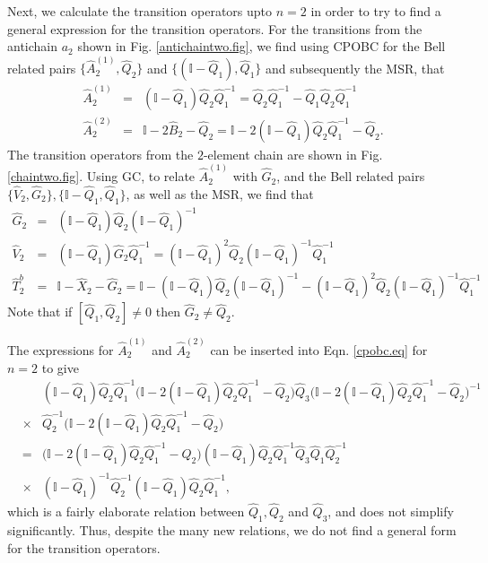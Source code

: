 \documentclass[11pt]{article}
\newcommand{\hA}{\hat { A}}
\newcommand{\hG}{\hat G}
\newcommand{\hQ}{\hat Q}
\newcommand{\achain}{a}
\newcommand{\id}{\mathbb I}
\newcommand{\h}{\hat}
\begin{document}
Next, we calculate the transition operators  upto
$n=2$ in order to try to find a general expression for the 
transition operators. 
For the transitions from the antichain $\achain_2$ shown in
Fig. \ref{antichaintwo.fig}, we find  using CPOBC for the   Bell related pairs $\{\hA_2^{(1)},
\hQ_2 \}$ and $\{ (\id -\hQ_1), \hQ_1\}$ and subsequently the MSR,
that 
\begin{eqnarray}
\h A_2^{(1)}&=&(\mathbb{I}-\h Q_1) \h Q_2\h Q_1^{-1}=\h Q_2\h Q_1^{-1}-\h Q_1\h Q_2\h Q_1^{-1}\\
\h A_2^{(2)}&=&\mathbb{I}-2\h B_2-\h Q_2 =\mathbb{I}-2 (\mathbb{I}-\h Q_1) \h Q_2\h Q_1^{-1}-\h Q_2. 
\end{eqnarray}
The transition operators from the $2$-element chain  
are shown in Fig. \ref{chaintwo.fig}.  Using GC, to relate $\hA_2^{(1)}$ with $\hG_2$,  and the Bell related
 pairs $\{ \h V_2, \hG_2 \}, \{ \id - \hQ_1, \hQ_1\}$, as well as the
 MSR, we find that   
 \begin{eqnarray}
 \h G_2&=&(\mathbb{I}-\h Q_1)\h Q_2(\mathbb{I}-\h Q_1)^{-1}\\
 \h V_2&=&(\mathbb{I}-\h Q_1)\h G_2\h Q_1^{-1}=(\mathbb{I}-\h Q_1)^2\h Q_2 (\mathbb{I}-\h Q_1)^{-1}\h Q_1^{-1}\\
 \h T_2^b&=&\mathbb{I}-\h X_2-\h G_2 = \mathbb{I}- (\mathbb{I}-\h
             Q_1)\h Q_2(\mathbb{I}-\h Q_1)^{-1}-(\mathbb{I}-\h
             Q_1)^2\h Q_2 (\mathbb{I}-\h Q_1)^{-1}\h Q_1^{-1} 
 \end{eqnarray}
 Note that if  $[ \hQ_1, \hQ_2] \neq 0$ then $\h G_2 \neq \h
 Q_2$. 

 The expressions for $\hA_2^{(1)}$ and $\h A_2^{(2)}$ can be inserted into Eqn. \eqref{cpobc.eq} for
$n=2$ to give
\begin{eqnarray} 
&& (\mathbb{I}-\h Q_1) \h Q_2\h Q_1^{-1} \biggl(\mathbb{I}-2
  (\mathbb{I}-\h Q_1) \h Q_2\h Q_1^{-1}-\h Q_2\biggr) \h Q_3  \biggl(\mathbb{I}-2
  (\mathbb{I}-\h Q_1) \h Q_2\h Q_1^{-1}-\h Q_2\biggr)^{-1} \nonumber
  \\ &\times & \hQ_2^{-1} \biggl(\mathbb{I}-2
  (\mathbb{I}-\h Q_1) \h Q_2\h Q_1^{-1}-\h Q_2\biggr)   \nonumber \\
  &=&  \biggl(\mathbb{I}-2
  (\mathbb{I}-\h Q_1) \h Q_2\h Q_1^{-1}-\h Q_2\biggr) (\mathbb{I}-\h
      Q_1) \h Q_2\h Q_1^{-1} \h Q_3 \h Q_1 \h Q_2^{-1} \nonumber \\ &\times &  (\mathbb{I}-\h Q_1)^{-1} \h Q_2^{-1}
       (\mathbb{I}-\h Q_1) \h Q_2\h Q_1^{-1}, 
  \end{eqnarray} 
which is a fairly elaborate relation between $\hQ_1,\hQ_2$ and
$\hQ_3$, and does not simplify significantly. Thus, despite the many
new relations, we do not find a general form for the transition
operators. 
\end{document}
